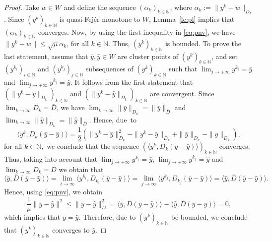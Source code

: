 \begin{proof}
	Take $w\in W$ and define the sequence $(\alpha_k)_{k\in\mathbb{N}}$, where $\alpha_k:=\|y^{k}-w\|_{D_{k}}$. Since $(y^k)_{k\in\mathbb{N}}$ is quasi-Fej\'er  monotone to $W$, Lemma~\ref{le:pl} implies that $(\alpha_k)_{k\in\mathbb{N}}$ converges. Now, by using  the  first  inequality in \eqref{eq:pnv}, we have  $\|y^{k}-w\|\leq \sqrt{\mu} \alpha_k$, for all $k\in  \mathbb{N}$.  Thus, $(y^k)_{k\in\mathbb{N}}$ is bounded. To prove the last statement, assume that   ${\bar y}, {\hat y} \in  W$   are  cluster points of $(y^k)_{k\in\mathbb{N}}$, and set   $(y^{k_i})_{i\in\mathbb{N}}$ and  $(y^{k_j})_{j\in\mathbb{N}}$  subsequences  of $(y^k)_{k\in\mathbb{N}}$ such that $\lim_{j\to +\infty} y^{k_i} = {\bar y}$ and $\lim_{j\to +\infty} y^{k_j} = {\hat y}$. It follows from the first statement that  $(\|y^{k}- {\bar y}\|_{D_{k}})_{k\in\mathbb{N}}$ and  $(\|y^{k}- {\hat y}\|_{D_{k}})_{k\in\mathbb{N}}$ are convergent. Since $\lim_{k\rightarrow\infty}D_k={\bar D}$, we have  $\lim_{k\rightarrow\infty}\|{\bar y}\|_{D_k}={\|\bar y}\|_{{\bar D}}$ and $\lim_{k\rightarrow\infty}\|{\hat y}\|_{D_k}={\|\hat y}\|_{{\bar D}}$. Hence,  due~to
	$$
		\langle y^k,  D_k({\bar y}- {\hat y})\rangle=\frac{1}{2}(\|y^{k}- {\hat y}\|_{D_{k}}^2-\|y^{k}- {\bar y}\|_{D_{k}} +\| {\bar y}\|_{D_{k}}-\| {\hat y}\|_{D_{k}}),
	$$
	for all $k\in {\mathbb N},$ we conclude that the sequence  $(\langle  y^k,  D_k({\bar y}- {\hat y})\rangle)_{k\in\mathbb{N}}$ converges.  Thus, taking into account that   $\lim_{j\to +\infty} y^{k_i} = {\bar y}$, $\lim_{j\to +\infty} y^{k_j} = {\hat y}$ and  $\lim_{k\rightarrow\infty}D_k={\bar D}$ we obtain that
	$$
		\langle  {\bar y},  {\bar D}({\bar y}- {\hat y})\rangle=\lim_{i\rightarrow\infty} \langle y^{k_i},  D_{k_i}({\bar y}- {\hat y})\rangle=\lim_{j\rightarrow\infty} \langle y^{k_j},  D_{k_j}({\bar y}- {\hat y})\rangle= \langle  {\hat y},  {\bar D}({\bar y}- {\hat y})\rangle.
	$$
	Hence, using \eqref{eq:pnv}, we obtain
	$$
		\frac{1}{\mu}\|{\bar y}- {\hat y}\|^2\leq  \|{\bar y}- {\hat y}\|^2_{\bar D}=  \langle  {\bar y},  {\bar D}({\bar y}- {\hat y})\rangle-  \langle  {\hat y},  {\bar D}({\bar y}- {\hat y})\rangle=0,
	$$
	which implies that ${\bar y}= {\hat y}$. Therefore, due to  $(y^k)_{k\in\mathbb{N}}$ be bounded, we conclude that    $(y^k)_{k\in\mathbb{N}}$ converges to ${\bar y}$.
\end{proof}
